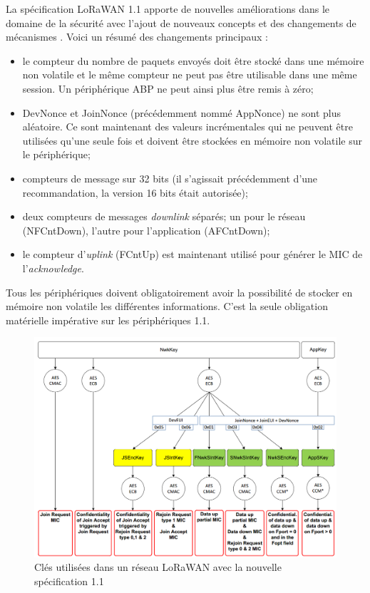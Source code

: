 La spécification LoRaWAN 1.1 apporte de nouvelles améliorations dans le domaine de la sécurité avec l'ajout de nouveaux concepts et des changements de mécanismes \cite{lorawan1_1_video:online}. Voici un résumé des changements principaux :
\begin{itemize}
    \item le compteur du nombre de paquets envoyés doit être stocké dans une mémoire non volatile et le même compteur ne peut pas être utilisable dans une même session. Un périphérique ABP ne peut ainsi plus être remis à zéro;
    
    \item DevNonce et JoinNonce (précédemment nommé AppNonce) ne sont plus aléatoire. Ce sont maintenant des valeurs incrémentales qui ne peuvent être utilisées qu'une seule fois et doivent être stockées en mémoire non volatile sur le périphérique;
    
    \item compteurs de message sur 32 bits (il s'agissait précédemment d'une recommandation, la version 16 bits était autorisée);
    
    \item deux compteurs de messages \textit{downlink} séparés; un pour le réseau (NFCntDown), l'autre pour l'application (AFCntDown);
    
    \item le compteur d'\textit{uplink} (FCntUp) est maintenant utilisé pour générer le MIC de l'\textit{acknowledge}.
    
\end{itemize}

Tous les périphériques doivent obligatoirement avoir la possibilité de stocker en mémoire non volatile les différentes informations. C'est la seule obligation matérielle impérative sur les périphériques 1.1. 

\begin{figure}[ht!]
    \centering
    \includegraphics[width=1.0\textwidth]{Figures/Security/LoRaWAN/lorawan1_1_keys.PNG}
    \caption{Clés utilisées dans un réseau LoRaWAN avec la nouvelle spécification 1.1}
    \label{fig-lorawan1_1_keys}
\end{figure}

